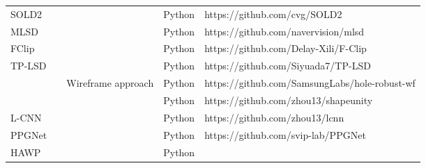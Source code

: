 \documentclass[journal,compsoc]{IEEEtran}
\begin{document}
\begin{table*}[tbp]
\begin{tabular}{|p{}<{\centering}|p{}<{\centering}|p{}<{\centering}|p{}<{\centering}|p{}<{\centering}|}
		SOLD2 \cite{SOLD2}                                                                          & \multicolumn{1}{c|}{}                                 &                                          & Python         & https://github.com/cvg/SOLD2                                           \\ \cline{1-1} \cline{4-5}  		MLSD \cite{TowardsRealtimeandLightweightLineSegmentDetection}                               & \multicolumn{1}{c|}{}                                 &                                          & Python         & https://github.com/navervision/mlsd                                    \\ \cline{1-1} \cline{4-5}  		FClip \cite{FullyConvolutionalLineParsing}                                                 & \multicolumn{1}{c|}{}                                 &                                          & Python         & https://github.com/Delay-Xili/F-Clip                                   \\ \cline{1-1} \cline{4-5}  		TP-LSD \cite{TP-LSD}                                                                        & \multicolumn{1}{c|}{}                                 &                                          & Python         & https://github.com/Siyuada7/TP-LSD                                     \\ \cline{1-1} \cline{3-5}  		\cite{Hole-robustWireframeDetection}                                                        & \multicolumn{1}{c|}{}                                 & \multirow{6}{*}{Wireframe approach}               & Python         & https://github.com/SamsungLabs/hole-robust-wf                          \\ \cline{1-1} \cline{4-5}  		\cite{LearningtoReconstruct3DManhattanWireframesFromaSingleImage}                           & \multicolumn{1}{c|}{}                                 &                                          & Python         & https://github.com/zhou13/shapeunity                                   \\ \cline{1-1} \cline{4-5}  		L-CNN \cite{End-to-EndWireframeParsing}                                                     & \multicolumn{1}{c|}{}                                 &                                          & Python         & https://github.com/zhou13/lcnn                                         \\ \cline{1-1} \cline{4-5}  		PPGNet \cite{PPGNet}                                                                        & \multicolumn{1}{c|}{}                                 &                                          & Python         & https://github.com/svip-lab/PPGNet                                     \\ \cline{1-1} \cline{4-5}  		HAWP \cite{Holistically-AttractedWireframeParsing}                                          & \multicolumn{1}{c|}{}                                 &                                          & Python         & 
\end{tabular}
\end{table*}
\end{document}
